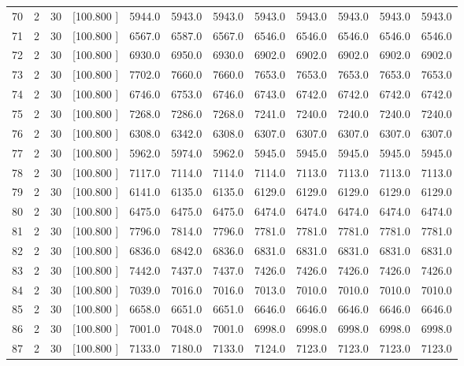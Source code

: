 \documentclass[12pt,a4paper]{article}
\begin{document}
\begin{center}
{\begin{tabular}{r r r r r r r r r r r r}
  70&  2& 30&[100.800   ]&  5944.0&  5943.0&  5943.0&  5943.0&  5943.0&  5943.0&  5943.0&  5943.0\\[-0.02in]
  71&  2& 30&[100.800   ]&  6567.0&  6587.0&  6567.0&  6546.0&  6546.0&  6546.0&  6546.0&  6546.0\\[-0.02in]
  72&  2& 30&[100.800   ]&  6930.0&  6950.0&  6930.0&  6902.0&  6902.0&  6902.0&  6902.0&  6902.0\\[-0.02in]
  73&  2& 30&[100.800   ]&  7702.0&  7660.0&  7660.0&  7653.0&  7653.0&  7653.0&  7653.0&  7653.0\\[-0.02in]
  74&  2& 30&[100.800   ]&  6746.0&  6753.0&  6746.0&  6743.0&  6742.0&  6742.0&  6742.0&  6742.0\\[-0.02in]
  75&  2& 30&[100.800   ]&  7268.0&  7286.0&  7268.0&  7241.0&  7240.0&  7240.0&  7240.0&  7240.0\\[-0.02in]
  76&  2& 30&[100.800   ]&  6308.0&  6342.0&  6308.0&  6307.0&  6307.0&  6307.0&  6307.0&  6307.0\\[-0.02in]
  77&  2& 30&[100.800   ]&  5962.0&  5974.0&  5962.0&  5945.0&  5945.0&  5945.0&  5945.0&  5945.0\\[-0.02in]
  78&  2& 30&[100.800   ]&  7117.0&  7114.0&  7114.0&  7114.0&  7113.0&  7113.0&  7113.0&  7113.0\\[-0.02in]
  79&  2& 30&[100.800   ]&  6141.0&  6135.0&  6135.0&  6129.0&  6129.0&  6129.0&  6129.0&  6129.0\\[-0.02in]
  80&  2& 30&[100.800   ]&  6475.0&  6475.0&  6475.0&  6474.0&  6474.0&  6474.0&  6474.0&  6474.0\\[-0.02in]
  81&  2& 30&[100.800   ]&  7796.0&  7814.0&  7796.0&  7781.0&  7781.0&  7781.0&  7781.0&  7781.0\\[-0.02in]
  82&  2& 30&[100.800   ]&  6836.0&  6842.0&  6836.0&  6831.0&  6831.0&  6831.0&  6831.0&  6831.0\\[-0.02in]
  83&  2& 30&[100.800   ]&  7442.0&  7437.0&  7437.0&  7426.0&  7426.0&  7426.0&  7426.0&  7426.0\\[-0.02in]
  84&  2& 30&[100.800   ]&  7039.0&  7016.0&  7016.0&  7013.0&  7010.0&  7010.0&  7010.0&  7010.0\\[-0.02in]
  85&  2& 30&[100.800   ]&  6658.0&  6651.0&  6651.0&  6646.0&  6646.0&  6646.0&  6646.0&  6646.0\\[-0.02in]
  86&  2& 30&[100.800   ]&  7001.0&  7048.0&  7001.0&  6998.0&  6998.0&  6998.0&  6998.0&  6998.0\\[-0.02in]
  87&  2& 30&[100.800   ]&  7133.0&  7180.0&  7133.0&  7124.0&  7123.0&  7123.0&  7123.0&  7123.0\\[-0.02in]

\end{tabular}}
\end{center}
\end{document}
